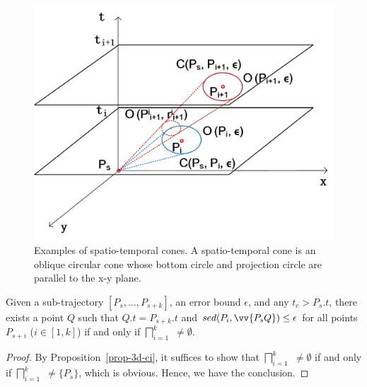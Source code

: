 \begin{figure}[tb!]
\centering
\includegraphics[scale=0.6]{figures/Fig-cis.png}
\vspace{-2ex}
\caption{\small Examples of spatio-temporal cones. A spatio-temporal cone is an oblique circular cone whose bottom circle and projection circle are parallel to the x-y plane. }
\vspace{-2ex}
\label{fig:cis}
\end{figure}





\begin{prop}
\label{prop-circle-intersection}
Given a sub-trajectory $[P_s,...,P_{s+k}]$, an error bound $\epsilon$, and any $t_c > P_s.t$, there exists a point $Q$ such that $Q.t = P_{s+k}.t$ and $sed(P_i, \vv{P_sQ})\le \epsilon$ for all points $P_{s+i}$ ($i \in [1,k]$) if and only if $\bigsqcap_{i=1}^{k}$ $\ne \emptyset$.
\end{prop}


\begin{proof}
By Proposition~\ref{prop-3d-ci}, it suffices to show that $\bigsqcap_{i=1}^{k} $ $\ne \emptyset$ if and only if $\bigsqcap_{i=1}^{k}$ $\ne \{P_s\}$, which is obvious. Hence, we have the conclusion.
\end{proof}

